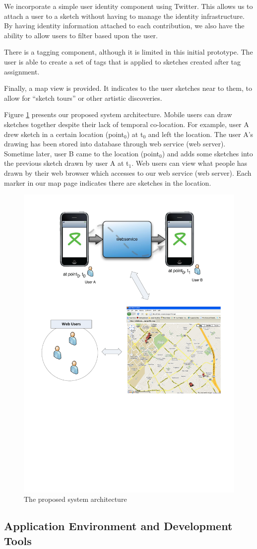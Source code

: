 \documentclass{chi2009}
\begin{document}
We incorporate a simple user identity component using Twitter. This allows us to attach a user to a sketch without having to manage the identity infrastructure.  By having identity information attached to each
contribution, we also have the ability to allow users to filter based upon
the user.

There is a tagging component, although it is limited in this initial
prototype.  The user is able to create a set of tags that is applied
to sketches created after tag assignment.

Finally, a map view is provided. It indicates to the user sketches
near to them, to allow for ``sketch tours'' or other artistic discoveries.

Figure \ref{fig:arch} presents our proposed system architecture. Mobile users
can draw sketches together despite their lack of temporal co-location. For
example, user A drew sketch in a certain location (point$_{0}$) at t$_{0}$ and
left the location. The user A's drawing has been stored into database through
web service (web server). Sometime later, user B came to the location
(point$_{0}$) and adds some sketches into the previous sketch drawn by user A
at t$_{1}$. Web users can view what people has drawn by their web browser which
accesses to our web service (web server). Each marker in our map page indicates
there are sketches in the location.

\begin{figure}
\centering
\includegraphics[width=.5\textwidth]{architecture.pdf}
\caption{The proposed system architecture}
\label{fig:arch}
\end{figure}

\subsection{Application Environment and Development Tools}
\end{document}
